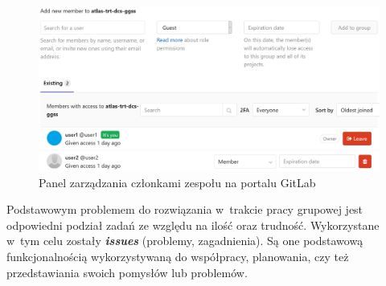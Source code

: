 \begin{figure}[H]
\centering
\includegraphics[width=\textwidth]{res/png/memberManagementPanel}
\caption{Panel zarządzania członkami zespołu na portalu GitLab}
\label{fig:memMan}
\end{figure}


Podstawowym problemem do rozwiązania w~trakcie pracy grupowej jest odpowiedni podział zadań ze względu na ilość oraz trudność. Wykorzystane w~tym celu zostały \textit{\textbf{issues}} (problemy, zagadnienia). Są one podstawową funkcjonalnością wykorzystywaną do współpracy, planowania, czy też przedstawiania swoich pomysłów lub problemów.

